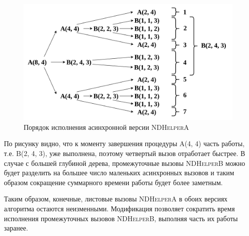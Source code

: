 \begin{figure}[h]
\centering
\includegraphics[width=\textwidth]{images/async_nda.png}
    \caption{Порядок исполнения асинхронной версии \textsc{NDHelperA}}
\end{figure}

По рисунку видно, что к моменту завершения процедуры \textsc{A(4, 4)} часть работы, т.е. \textsc{B(2, 4, 3)}, уже выполнена, поэтому четвертый вызов отработает быстрее.
В случае с большей глубиной дерева, промежуточные вызовы \textsc{NDHelperB} можно будет разделить на большее число маленьких асинхронных вызовов и таким образом сокращение суммарного времени работы будет более заметным.

Таким образом, конечные, листовые вызовы \textsc{NDHelperA} в обоих версиях алгоритма остаются неизменными.
Модификация позволяет сократить время исполнения промежуточных вызовов \textsc{NDHelperB}, выполняя часть их работы заранее.
